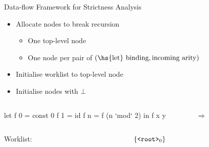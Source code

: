 \documentclass{haskellbeamer}
\begin{document}
\begin{frame}[fragile]{Data-flow Framework for Strictness Analysis}
  \begin{itemize}
    \item Allocate nodes to break recursion
      \begin{itemize}
        \item One top-level node
        \item One node per pair of $(\text{\hs{let} binding}, \text{incoming arity})$
      \end{itemize}
    \item Initialise worklist to top-level node
    \item Initialise nodes with $\bot$
  \end{itemize}
  \begin{overprint}
    \begin{columns}
      \begin{column}{0.35\textwidth}
        \begin{haskell}
          let f 0 = const 0
              f 1 = id 
              f n = f (n `mod` 2)
          in f x y
        \end{haskell}
      \end{column}
      \begin{column}{0.02\textwidth}
        {\Huge$\Rightarrow$}
      \end{column}
      \begin{column}{0.4\textwidth}
      \end{column}
    \end{columns}
    \begin{columns}
      \begin{column}{0.55\textwidth}
        \hfill Worklist:
      \end{column}
      \begin{column}{0.55\textwidth}
        $\{\text{$\text{\texttt{<root>}}_{0}$}\}$ \hfill
      \end{column}
    \end{columns}
  \end{overprint}
\end{frame}
\end{document}
